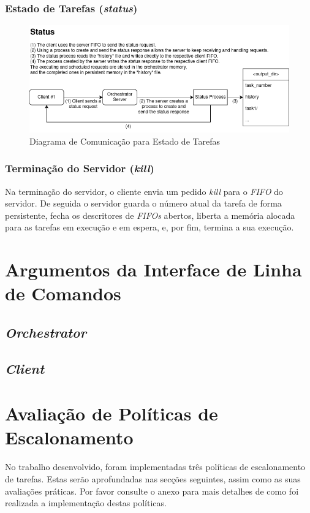 \documentclass[a4paper,11pt]{scrreprt}
\begin{document}
        \subsection{Estado de Tarefas (\textit{status})}
            \begin{figure}[!ht]
                \centering
                \includegraphics[width=\textwidth]{diagrams/status.png}
                \caption{Diagrama de Comunicação para Estado de Tarefas}
                \label{fig:1.3}
            \end{figure}
        \subsection{Terminação do Servidor (\textit{kill})}
            Na terminação do servidor, o cliente envia um pedido \textit{kill} para o \textit{FIFO} do servidor.
            De seguida o servidor guarda o número atual da tarefa de forma persistente,
            fecha os descritores de \textit{FIFOs} abertos,
            liberta a memória alocada para as tarefas em execução e em espera, e, por fim, termina a
            sua execução.

\begin{minipage}{\textwidth}
\chapter{Argumentos da Interface de Linha de Comandos}
    \section{\textit{Orchestrator}}
    \section{\textit{Client}}
\end{minipage}

\chapter{Avaliação de Políticas de Escalonamento}
    No trabalho desenvolvido, foram implementadas três políticas de escalonamento de tarefas.
    Estas serão aprofundadas nas secções seguintes, assim como as suas avaliações práticas.
    Por favor consulte o anexo  para mais detalhes de como foi realizada
    a implementação destas políticas.
\end{document}
